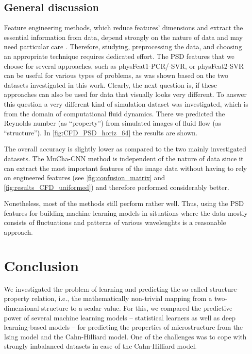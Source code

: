 \documentclass[11pt, authoryear]{elsarticle}
\renewcommand\textcolor[2]{#2}
\begin{document}
	\subsection{General discussion}
	\textcolor{red}{
		Feature engineering methods, which reduce features' dimensions and extract the essential information from data, depend strongly on the nature of data and 
		may need particular care \citep{nguyen2019ten}. Therefore, studying, preprocessing the data, and choosing an appropriate technique requires dedicated effort. The \gls{PSD} features that we choose for several approaches, such as physFeat1-PCR/-SVR, or physFeat2-SVR can be useful for various types of problems, as was shown based on
		the two datasets investigated in this work. Clearly, the next question is, if these approaches can also
		be used for data that visually looks very different. To answer this question
		a very different kind of simulation dataset was investigated, which is
		from the domain of computational fluid dynamics. There we predicted the Reynolds 
		number (as ``property'') from simulated images of fluid flow (as ``structure''). 
		In \cref{fig:CFD_PSD_horiz_64} the results are shown. }
	\textcolor{red}{
		The overall accuracy is slightly lower as compared to the two mainly 
		investigated datasets. The MuCha-CNN method is independent of the nature of data 
		since it can extract the most important features of the image data without having
		to rely on engineered features (see \cref{fig:confusion_matrix} and \cref{fig:results_CFD_uniformed}) and therefore performed considerably better.
	}
	\textcolor{red}{
		Nonetheless, most of the methods still perform rather well. Thus, 
		using the \gls{PSD} features for building machine learning models in situations
		where the data mostly consists of fluctuations and patterns of various
		wavelenghts is a reasonable approach. 
	}
	

	
	\section{Conclusion}
	We investigated the problem of learning and predicting the so-called 
	structure-property relation, i.e., the mathematically non-trivial mapping from 
	a two-dimensional structure to a scalar value. For this, we compared the predictive
	power of several machine learning models -- statistical learners as well as
	deep learning-based models -- for predicting the properties of 
	microstructure from the Ising model and the Cahn-Hilliard model. One
	of the challenges was to cope with strongly imbalanced datasets in case of the Cahn-Hilliard
	model.
	
\end{document}
